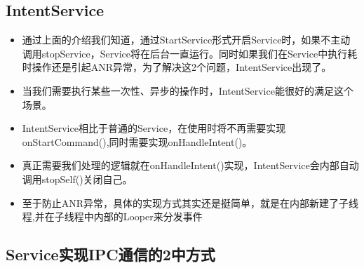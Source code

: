\documentclass[9pt, b5paper]{article}
\begin{document}
\subsection{IntentService}
\label{sec-1-5}
\begin{itemize}
\item 通过上面的介绍我们知道，通过StartService形式开启Service时，如果不主动调用stopService，Service将在后台一直运行。同时如果我们在Service中执行耗时操作还是引起ANR异常，为了解决这2个问题，IntentService出现了。
\item 当我们需要执行某些一次性、异步的操作时，IntentService能很好的满足这个场景。
\item IntentService相比于普通的Service，在使用时将不再需要实现onStartCommand(),同时需要实现onHandleIntent()。
\item 真正需要我们处理的逻辑就在onHandleIntent()实现，IntentService会内部自动调用stopSelf()关闭自己。
\item 至于防止ANR异常，具体的实现方式其实还是挺简单，就是在内部新建了子线程,并在子线程中内部的Looper来分发事件
\end{itemize}

\subsection{Service实现IPC通信的2中方式}
\label{sec-1-6}
\end{document}
